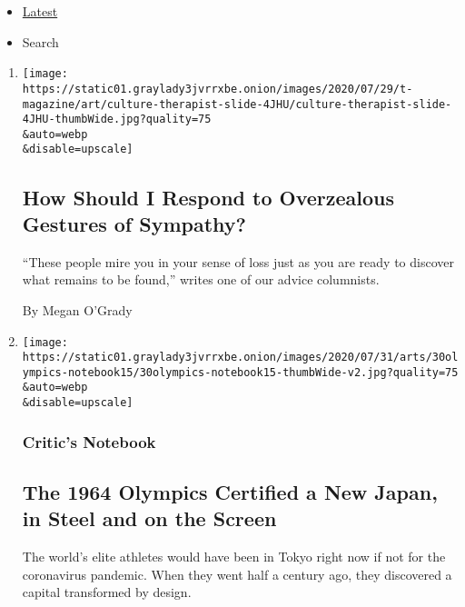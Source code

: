 \begin{itemize}
\tightlist
\item
  \protect\hyperlink{stream-panel}{Latest}
\item
  Search
\end{itemize}

\begin{enumerate}
\def\labelenumi{\arabic{enumi}.}
\item
  \href{/2020/07/31/t-magazine/culture-therapist-grief.html}{}

  \texttt{[image: https://static01.graylady3jvrrxbe.onion/images/2020/07/29/t-magazine/art/culture-therapist-slide-4JHU/culture-therapist-slide-4JHU-thumbWide.jpg?quality=75\\\&auto=webp\\\&disable=upscale]}

  \hypertarget{how-should-i-respond-to-overzealous-gestures-of-sympathy}{%
  \subsection{How Should I Respond to Overzealous Gestures of
  Sympathy?}\label{how-should-i-respond-to-overzealous-gestures-of-sympathy}}

  ``These people mire you in your sense of loss just as you are ready to
  discover what remains to be found,'' writes one of our advice
  columnists.

  By Megan O'Grady
\item
  \href{/2020/07/30/arts/design/tokyo-olympics-1964-design.html}{}

  \texttt{[image: https://static01.graylady3jvrrxbe.onion/images/2020/07/31/arts/30olympics-notebook15/30olympics-notebook15-thumbWide-v2.jpg?quality=75\\\&auto=webp\\\&disable=upscale]}

  \hypertarget{critics-notebook}{%
  \subsubsection{Critic's Notebook}\label{critics-notebook}}

  \hypertarget{the-1964-olympics-certified-a-new-japan-in-steel-and-on-the-screen}{%
  \subsection{The 1964 Olympics Certified a New Japan, in Steel and on
  the
  Screen}\label{the-1964-olympics-certified-a-new-japan-in-steel-and-on-the-screen}}

  The world's elite athletes would have been in Tokyo right now if not
  for the coronavirus pandemic. When they went half a century ago, they
  discovered a capital transformed by design.


\end{enumerate}
